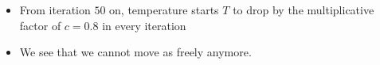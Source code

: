 \documentclass[11pt,compress,t,notes=noshow, xcolor=table]{beamer}
\begin{document}
\begin{frame}
\begin{center}
{    \begin{itemize}
          \item From iteration $50$ on, temperature starts $T$ to drop by the multiplicative factor of $c = 0.8$ in every iteration
          \item We see that we cannot move as freely anymore. 
    \end{itemize}}%











\end{center}
\end{frame}
\end{document}
